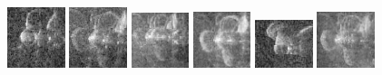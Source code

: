 \begin{figure}
    \includegraphics[width=0.15\textwidth]{chapters/images/dataset/all-class-images/propeler/propeler-73.jpg}
    \includegraphics[width=0.15\textwidth]{chapters/images/dataset/all-class-images/propeler/propeler-51.jpg}
    \includegraphics[width=0.15\textwidth]{chapters/images/dataset/all-class-images/propeler/propeler-86.jpg}
    \includegraphics[width=0.15\textwidth]{chapters/images/dataset/all-class-images/propeler/propeler-38.jpg}
    \includegraphics[width=0.15\textwidth]{chapters/images/dataset/all-class-images/propeler/propeler-128.jpg}
    \includegraphics[width=0.15\textwidth]{chapters/images/dataset/all-class-images/propeler/propeler-28.jpg}
    

\end{figure}
